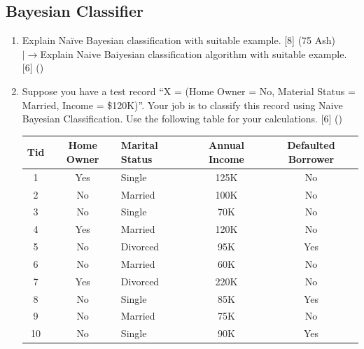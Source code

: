 \documentclass[12pt]{article}
\newcommand{\lb}{\\$\left|\rightarrow\right.$}
\begin{document}
  \subsection{Bayesian Classifier}
    \begin{enumerate}[topsep=0pt, noitemsep]
      \item Explain Na\"ive Bayesian classification with suitable example. \hfill [8] (75 Ash)
        \lb Explain Naive Baiyesian classification algorithm with suitable example. \hfill [6] ()

      \item Suppose you have a test record ``X = (Home Owner = No, Material Status = Married, Income = \$120K)''. Your job is to classify this record using Naive Bayesian Classification. Use the following table for your calculations. \hfill [6] ()\\
        \small
        \begin{tabular}{|c|c|l|c|c|}
          \hline
          Tid & Home Owner & Marital Status & Annual Income & Defaulted Borrower \\ \hline
          1 & Yes & Single & 125K & No \\ \hline
          2 & No & Married & 100K & No \\ \hline
          3 & No & Single & 70K & No \\ \hline
          4 & Yes & Married & 120K & No \\ \hline
          5 & No & Divorced & 95K & Yes \\ \hline
          6 & No & Married & 60K & No \\ \hline
          7 & Yes & Divorced & 220K & No \\ \hline
          8 & No & Single & 85K & Yes \\ \hline
          9 & No & Married & 75K & No \\ \hline
          10 & No & Single & 90K & Yes \\ \hline
        \end{tabular}
        \normalsize


\end{enumerate}
\end{document}
